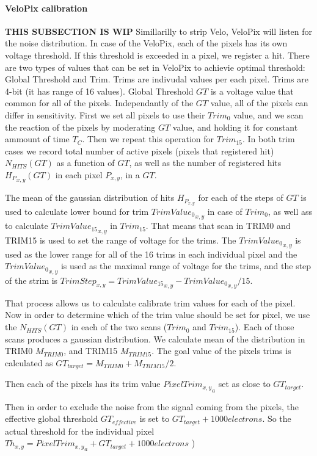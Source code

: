 \paragraph{VeloPix calibration}
\textbf{THIS SUBSECTION IS WIP}
Simillarilly to strip Velo, VeloPix will listen for the noise distribution. In
case of the VeloPix, each of the pixels has its own voltage threshold. If this
threshold is exceeded in a pixel, we register a hit.
There are two types of values that can be set in VeloPix to achievie optimal
threshold: Global Threshold and Trim.
Trims are indivudal values per each pixel. Trims are 4-bit (it has range of
16 values).
Global Threshold $GT$ is a voltage value that common for all of the pixels.
Independantly of the $GT$ value, all of the pixels can differ in
sensitivity.
First we set all pixels to use their $Trim_{0}$ value, and we scan the reaction of
the pixels by moderating $GT$ value, and holding it for constant
ammount of time $T_{C}$. Then we repeat this operation for $Trim_{15}$.
In both trim cases we record total number of active pixels (pixels that registered hit)
$N_{HITS}(GT)$ as a function of $GT$, as well as the number of registered hits ${H_P}_{x,y}(GT)$ in each
pixel $P_{x,y}$, in a $GT$.

The mean of the gaussian distribution of hits $H_{P_{x,y}}$ for each of the steps of $GT$ is
used to calculate lower bound for trim ${TrimValue_0}_{x,y}$ in case of
$Trim_{0}$, as well ass to calculate ${TrimValue_{15}}_{x,y}$ in $Trim_{15}$.
That means that scan in TRIM0 and TRIM15 is used to set the range of voltage for
the trims.
The ${TrimValue_{0}}_{x,y}$ is used as the lower range for all of the 16 trims in
each individual pixel and the ${TrimValue_{0}}_{x,y}$ is used as the maximal range
of voltage for the trims, and the step of the strim is
$TrimStep_{x,y} ={TrimValue_{15}}_{x,y}-{TrimValue_{0}}_{x,y}/15 $.

That process allows us to calculate calibrate trim values for each of the pixel.
Now in order to determine which of the trim value should be set for pixel, we
use the $N_{HITS}(GT)$ in each of the two scans ($Trim_{0}$ and $Trim_{15}$). Each of those scans
produces a gaussian distribution.
We calculate mean of the distribution in TRIM0 $M_{TRIM0}$, and TRIM15
$M_{TRIM15}$. The goal value of the pixels trims is calculated as
$GT_{target} = M_{TRIM0}+M_{TRIM15}/2$.

Then each of the pixels has its trim value ${PixelTrim_{x,y}}_{a}$ set as close to
$GT_{target}$.

Then in order to exclude the noise from the signal coming from the pixels, the
effective global threshold $GT_{effective}$ is set to
$GT_{target} + 1000 electrons$.
So the actual threshold for the individual pixel
$Th_{x,y} = {PixelTrim_{x,y}}_{a} + GT_{target} + 1000 electrons$
)
